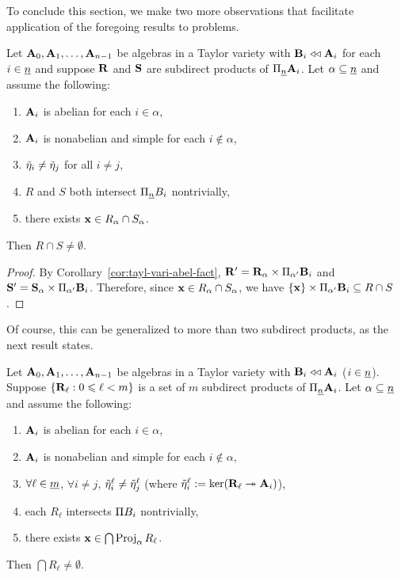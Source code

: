 To conclude this section, we make two more observations that 
facilitate application of the foregoing results to \csp problems. 
\begin{corollary}
  \label{cor:RT-cor}
Let $\mathbf{A}_0, \mathbf{A}_1, \dots, \mathbf{A}_{n-1}$ be algebras in a
Taylor variety with $\mathbf{B}_i \mathrel{\triangleleft\triangleleft} \mathbf{A}_i$ for each $i\in \underline{n}$ and suppose
$\mathbf{R}$ and $\mathbf{S}$ are subdirect products of $\Pi_{\underline{n}} \mathbf{A}_i$.
Let $\alpha \subseteq \underline{n}$ and assume the following:
\begin{enumerate}
\item $\mathbf{A}_i$ is abelian for each $i \in \alpha$,
\item $\mathbf{A}_i$ is nonabelian and simple for each $i \notin \alpha$,
\item $\tilde{\eta}_i \neq \tilde{\eta}_j$ for all $i\neq j$, %
\item $R$ and $S$ both intersect $\Pi_{\underline{n}} B_i$ nontrivially, 
\item there exists $\mathbf{x} \in R_\alpha \cap S_\alpha$.
\end{enumerate}
Then $R \cap S \neq \emptyset$.
\end{corollary}
\begin{proof}
  By Corollary~\ref{cor:tayl-vari-abel-fact},
$\mathbf{R}'= \mathbf{R}_\alpha   \times \Pi_{\alpha'}\mathbf{B}_i$ and
$\mathbf{S}'= \mathbf{S}_\alpha   \times \Pi_{\alpha'}\mathbf{B}_i$. 
Therefore, since $\mathbf{x} \in R_\alpha \cap S_\alpha$, we have
$\{\mathbf{x}\} \times \Pi_{\alpha'}\mathbf{B}_i \subseteq R \cap S$.
\end{proof}
Of course, this can be generalized to more than two subdirect products, as the 
next result states.
\begin{corollary}
  \label{cor:RT-cor-gen}
Let $\mathbf{A}_0, \mathbf{A}_1, \dots, \mathbf{A}_{n-1}$ be algebras in a
Taylor variety with $\mathbf{B}_i \mathrel{\triangleleft\triangleleft} \mathbf{A}_i$ ($i\in \underline{n}$).
Suppose $\{\mathbf{R}_\ell : 0\leqslant \ell < m\}$ is a set of $m$ subdirect products of 
$\Pi_{\underline{n}} \mathbf{A}_i$.
Let $\alpha \subseteq \underline{n}$ and assume the following:
\begin{enumerate}
\item $\mathbf{A}_i$ is abelian for each $i \in \alpha$,
\item $\mathbf{A}_i$ is nonabelian and simple for each $i \notin \alpha$,
\item $\forall \ell \in \underline{m}$, $\forall i\neq j$, 
  $\tilde{\eta}^\ell_i \neq \tilde{\eta}^\ell_j$ (where $\tilde{\eta}^\ell_i := \ker(\mathbf{R}_\ell \twoheadrightarrow \mathbf{A}_i)$),
\item\label{item:RT-cor-gen-4} each $R_\ell$ intersects $\Pi B_i$ nontrivially, 
\item\label{item:RT-cor-gen-5} there exists $\mathbf{x} \in \bigcap \operatorname{Proj}_\alpha R_\ell$.
\end{enumerate}
Then $\bigcap R_\ell \neq \emptyset$.
\end{corollary}








